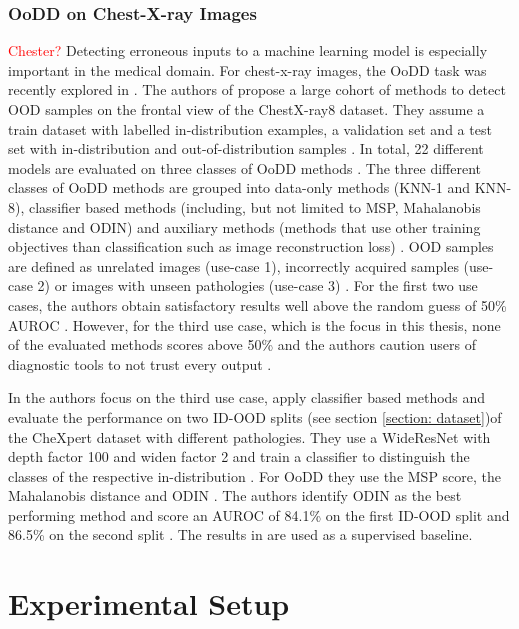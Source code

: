 \subsubsection*{OoDD on Chest-X-ray Images}
\textcolor{red}{Chester?}
Detecting erroneous inputs to a machine learning model is especially important in the medical domain.
For chest-x-ray images, the OoDD task was recently explored in \citep{Cao2020,Berger2021}.
The authors of \citep{Cao2020} propose a large cohort of methods to detect OOD samples on the frontal view of the ChestX-ray8 \citep{Wang2017} dataset.
They assume a train dataset with labelled in-distribution examples, a validation set and a test set with in-distribution and out-of-distribution samples \citep{Cao2020}.
In total, 22 different models are evaluated on three classes of OoDD methods \citep{Cao2020}.
The three different classes of OoDD methods are grouped into data-only methods (KNN-1 and KNN-8), classifier based methods (including, but not limited to MSP, Mahalanobis distance and ODIN) and auxiliary methods (methods that use other training objectives than classification such as image reconstruction loss) \citep{Cao2020}.
OOD samples are defined as unrelated images (use-case 1), incorrectly acquired samples (use-case 2) or images with unseen pathologies (use-case 3) \citep{Cao2020}.
For the first two use cases, the authors obtain satisfactory results well above the random guess of 50\% AUROC \citep{Cao2020}.
However, for the third use case, which is the focus in this thesis, none of the evaluated methods scores above 50\% and the authors caution users of diagnostic tools to not trust every output \citep{Cao2020}.
\par
In \citep{Berger2021} the authors focus on the third use case, apply classifier based methods and evaluate the performance on two ID-OOD splits (see section \ref{section: dataset})of the CheXpert dataset \citep{Irvin2019} with different pathologies.
They use a WideResNet \citep{Zagoruyko2016} with depth factor 100 and widen factor 2 and train a classifier to distinguish the classes of the respective in-distribution \citep{Berger2021}.
For OoDD they use the MSP score, the Mahalanobis distance and ODIN \citep{Berger2021}.
The authors identify ODIN as the best performing method and score an AUROC of 84.1\% on the first ID-OOD split and 86.5\% on the second split \citep{Berger2021}.
The results in \citep{Berger2021} are used as a supervised baseline.
\par
\section{Experimental Setup}

